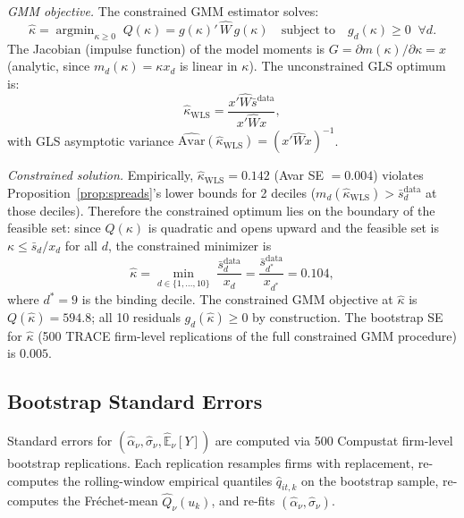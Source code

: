 \textit{GMM objective.} The constrained GMM estimator solves:
\begin{equation}
  \hat{\kappa} = \operatorname{argmin}_{\kappa \geq 0} \; Q(\kappa) = g(\kappa)'\,\hat{W}\,g(\kappa)
  \quad \text{subject to} \quad g_d(\kappa) \geq 0 \;\; \forall d.
  \label{eq:gmm_objective}
\end{equation}
The Jacobian (impulse function) of the model moments is $G = \partial m(\kappa)/\partial\kappa = x$ (analytic, since $m_d(\kappa) = \kappa x_d$ is linear in $\kappa$). The unconstrained GLS optimum is:
\begin{equation}
  \hat{\kappa}_{\text{WLS}} = \frac{x'\hat{W}\bar{s}^{\text{data}}}{x'\hat{W}x},
\end{equation}
with GLS asymptotic variance $\widehat{\mathrm{Avar}}(\hat{\kappa}_{\text{WLS}}) = (x'\hat{W}x)^{-1}$.

\textit{Constrained solution.} Empirically, $\hat{\kappa}_{\text{WLS}} = 0.142$ (Avar SE $= 0.004$) violates Proposition~\ref{prop:spreads}'s lower bounds for 2 deciles ($m_d(\hat{\kappa}_{\text{WLS}}) > \bar{s}_d^{\text{data}}$ at those deciles). Therefore the constrained optimum lies on the boundary of the feasible set: since $Q(\kappa)$ is quadratic and opens upward and the feasible set is $\kappa \leq \bar{s}_d/x_d$ for all $d$, the constrained minimizer is
\begin{equation}
  \hat{\kappa} = \min_{d\in\{1,\ldots,10\}}\;\frac{\bar{s}_d^{\text{data}}}{x_d}
               = \frac{\bar{s}_{d^*}^{\text{data}}}{x_{d^*}} = 0.104,
\end{equation}
where $d^* = 9$ is the binding decile. The constrained GMM objective at $\hat{\kappa}$ is $Q(\hat{\kappa}) = 594.8$; all 10 residuals $g_d(\hat{\kappa}) \geq 0$ by construction. The bootstrap SE for $\hat{\kappa}$ (500 TRACE firm-level replications of the full constrained GMM procedure) is $0.005$.

\subsection{Bootstrap Standard Errors}

Standard errors for $(\hat{\alpha}_\nu, \hat{\sigma}_\nu, \hat{\mathbb{E}}_\nu[Y])$ are computed via 500 Compustat firm-level bootstrap replications. Each replication resamples firms with replacement, re-computes the rolling-window empirical quantiles $\hat{q}_{it,k}$ on the bootstrap sample, re-computes the Fr\'{e}chet-mean $\hat{Q}_\nu(u_k)$, and re-fits $(\hat{\alpha}_\nu, \hat{\sigma}_\nu)$.

